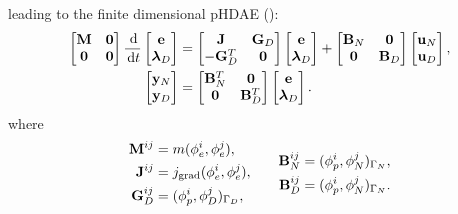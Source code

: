 \documentclass{ifacconf}
\begin{document}
 leading to the finite dimensional pHDAE (\cite{beattie2018linear}):
\begin{equation}
\begin{aligned}
\label{eq:discr_phdae}
\begin{bmatrix}
\mathbf{M} & \mathbf{0} \\
\mathbf{0} & \mathbf{0} \\
\end{bmatrix} \frac{\,\mathrm{d}}{\,\mathrm{d} t}
\begin{bmatrix}
\mathbf{e}\\
\bm{\lambda}_D \\
\end{bmatrix}
&= \begin{bmatrix}
\mathbf{J} & \mathbf{G}_D\\
-\mathbf{G}_D^T & \mathbf{0} \\
\end{bmatrix}
\begin{bmatrix}
\mathbf{e}\\
\bm{\lambda}_D \\
\end{bmatrix} + \begin{bmatrix}
\mathbf{B}_N & \mathbf{0}\\
\mathbf{0} & \mathbf{B}_D \\
\end{bmatrix}
\begin{bmatrix}
\mathbf{u}_N \\
\mathbf{u}_D \\
\end{bmatrix}, \\
\begin{bmatrix}
\mathbf{y}_N \\
\mathbf{y}_D \\
\end{bmatrix} &=
\begin{bmatrix}
\mathbf{B}_N^T & \mathbf{0} \\ 
\mathbf{0} & \mathbf{B}_D^T \\ 
\end{bmatrix}
\begin{bmatrix}
\mathbf{e}\\
\bm{\lambda}_D \\
\end{bmatrix}.
\end{aligned}
\end{equation}
where 
\begin{equation*}
\begin{aligned}
\mathbf{M}^{ij} &= m({\phi}_{e}^i, {\phi}_{e}^j), \\
\mathbf{J}^{ij} &= j_{\text{grad}}({\phi}_{e}^{i}, {\phi}_{e}^{j}), \\
\mathbf{G}_{D}^{ij} &= ({\phi}_{p}^i, {\phi}_{D}^j)_{\Gamma_D}, 
\end{aligned} \qquad 
\begin{aligned}
\mathbf{B}_{N}^{ij} &= ({\phi}_{p}^{i}, {\phi}_{N}^{j})_{\Gamma_N}, \\ \mathbf{B}_{D}^{ij} &= ({\phi}_{p}^{i}, {\phi}_{N}^{j})_{\Gamma_N}. 
\end{aligned}\\
\end{equation*}
\end{document}
